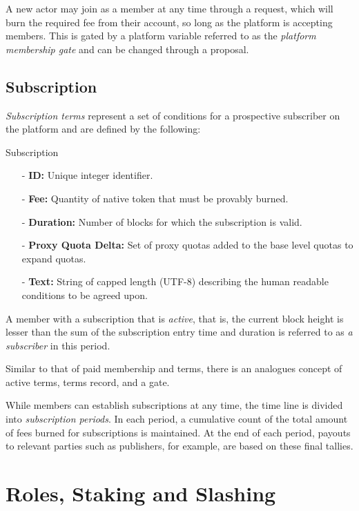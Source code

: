 \documentclass{article}
\newenvironment{concept_box}[1]
    {
    \begin{tcolorbox}
    {\large \textbf{#1} }
    }
    {
    \end{tcolorbox}
    }
\begin{document}
A new actor may join as a member at any time through a request, which will burn the required fee from their account, so long as the platform is accepting members. This is gated by a platform variable referred to as the \textit{platform membership gate} and can be changed through a proposal.

\subsection{Subscription} \label{sec:subscription}

\textit{Subscription terms} represent a set of conditions for a prospective subscriber on the platform and are defined by the following:\\

\begin{concept_box}{Subscription}
    \begin{itemize}
      \item[-] \textbf{ID:} Unique integer identifier.
      \item[-] \textbf{Fee:} Quantity of native token that must be provably burned.
      \item[-] \textbf{Duration:} Number of blocks for which the subscription is valid.
      \item[-] \textbf{Proxy Quota Delta:} Set of proxy quotas added to the base level quotas to expand quotas.
      \item[-] \textbf{Text:} String of capped length (UTF-8) describing the human readable conditions to be agreed upon.
    \end{itemize}
\end{concept_box}

A member with a subscription that is \textit{active}, that is, the current block height is lesser than the sum of the subscription entry time and duration is referred to as \textit{a subscriber} in this period.

Similar to that of paid membership and terms, there is an analogues concept of active terms, terms record, and a gate.

While members can establish subscriptions at any time, the time line is divided into \textit{subscription periods}. In each period, a cumulative count of the total amount of fees burned for subscriptions is maintained. At the end of each period, payouts to relevant parties such as publishers, for example, are based on these final tallies.

\section{Roles, Staking and Slashing} \label{sec:roles_staking_and_slashing}
\end{document}
